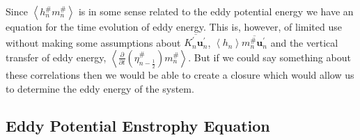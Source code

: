 \documentclass[12pt,a4paper]{report}
\newcommand*\thkmean[1]{\overline{#1}}
\newcommand*\thkres[1]{{#1}^{\prime}}
\newcommand*\nthkmean[1]{\left\langle{#1}\right\rangle}
\newcommand*\nthkres[1]{{#1}^{\#}}
\newcommand*{\half}{\frac{1}{2}}
\begin{document}
                Since $\nthkmean{\nthkres{h}_{n} \nthkres{m}_{n}}$ is in some sense
                related to the eddy potential energy we have
                an equation for the time evolution of eddy energy. This
                is, however, of limited use without making some assumptions about
                $\thkmean{\thkres{K}_{n} \thkres{\boldsymbol{u}}_{n}}$, 
                $\nthkmean{h_{n}}\thkmean{\nthkres{m}_{n}\thkres{\boldsymbol{u}}_{n}}$ 
                and the vertical transfer of eddy energy, 
                $ \nthkmean{\frac{\partial}{\partial t}\left(\nthkres{\eta}_{n-\half }\right) \nthkres{m}_{n}}$. 
                But if we could say something about these correlations
                then we would be able to create a closure which would allow us to
                determine the eddy energy of the system.
                
                
                \subsection{Eddy Potential Enstrophy Equation}
              
\end{document}
